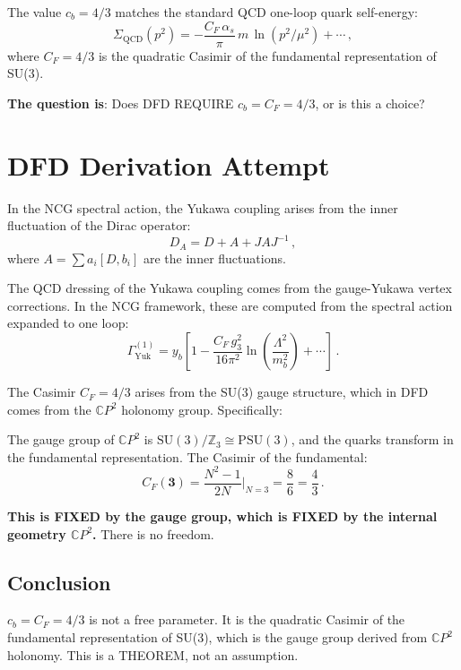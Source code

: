 \documentclass[11pt,a4paper]{article}
\newcommand{\CP}{\mathbb{C}P}
\begin{document}
The value $c_b = 4/3$ matches the standard QCD one-loop quark self-energy:
\begin{equation}
\Sigma_{\mathrm{QCD}}(p^2) = -\frac{C_F\,\alpha_s}{\pi}\,m\,\ln(p^2/\mu^2) + \cdots\,,
\end{equation}
where $C_F = 4/3$ is the quadratic Casimir of the fundamental representation of SU(3).

\textbf{The question is}: Does DFD REQUIRE $c_b = C_F = 4/3$, or is this a choice?

\section{DFD Derivation Attempt}

In the NCG spectral action, the Yukawa coupling arises from the inner fluctuation of the Dirac operator:
\begin{equation}
D_A = D + A + JAJ^{-1}\,,
\end{equation}
where $A = \sum a_i[D, b_i]$ are the inner fluctuations.

The QCD dressing of the Yukawa coupling comes from the gauge-Yukawa vertex corrections. In the NCG framework, these are computed from the spectral action expanded to one loop:
\begin{equation}
\Gamma^{(1)}_{\mathrm{Yuk}} = y_b\left[1 - \frac{C_F\,g_3^2}{16\pi^2}\ln\left(\frac{\Lambda^2}{m_b^2}\right) + \cdots\right]\,.
\end{equation}

The Casimir $C_F = 4/3$ arises from the SU(3) gauge structure, which in DFD comes from the $\CP^2$ holonomy group. Specifically:

The gauge group of $\CP^2$ is $\mathrm{SU}(3)/\mathbb{Z}_3 \cong \mathrm{PSU}(3)$, and the quarks transform in the fundamental representation. The Casimir of the fundamental:
\begin{equation}
C_F(\mathbf{3}) = \frac{N^2 - 1}{2N}\bigg|_{N=3} = \frac{8}{6} = \frac{4}{3}\,.
\end{equation}

\textbf{This is FIXED by the gauge group, which is FIXED by the internal geometry $\CP^2$.} There is no freedom.

\subsection{Conclusion}

$c_b = C_F = 4/3$ is not a free parameter. It is the quadratic Casimir of the fundamental representation of SU(3), which is the gauge group derived from $\CP^2$ holonomy. This is a THEOREM, not an assumption.
\end{document}
